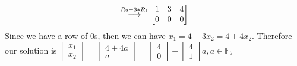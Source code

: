 \documentclass[12pt, letterpaper]{article}
\newcommand{\grstep}[2][\relax]{%
   \ensuremath{\mathrel{
       {\mathop{\longrightarrow}\limits^{#2\mathstrut}_{
                                     \begin{subarray}{l} #1 \end{subarray}}}}}}
\begin{document}
\begin{enumerate}
\begin{enumerate}
\begin{align*}
			\grstep[]{R_2 - 3*R_1}
			\begin{bmatrix}
			1 & 3 & 4\\
			0 & 0 & 0
			\end{bmatrix}
\end{align*}		 
	Since we have a row of 0s, then we can have $x_1 = 4 - 3x_2 = 4 + 4x_2$.
	Therefore our solution is $\begin{bmatrix} x_1 \\ x_2 	\end{bmatrix} =
	\begin{bmatrix} 4 + 4a \\ a 	\end{bmatrix}= \begin{bmatrix} 4 \\ 0 	\end{bmatrix} + \begin{bmatrix} 4 \\ 1 	\end{bmatrix}a, a \in \mathbb{F}_7$
	\end{enumerate}
	

\end{enumerate}
\end{document}
